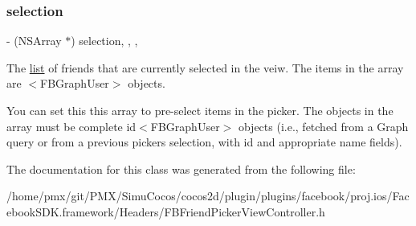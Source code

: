\subsubsection{\texorpdfstring{selection}{selection}}
{\footnotesize\ttfamily -\/ (N\+S\+Array $\ast$) selection\hspace{0.3cm}{\ttfamily [read]}, {\ttfamily [write]}, {\ttfamily [nonatomic]}, {\ttfamily [copy]}}

The \hyperlink{protocollist-p}{list} of friends that are currently selected in the veiw. The items in the array are $<$\+F\+B\+Graph\+User$>$ objects.

You can set this this array to pre-\/select items in the picker. The objects in the array must be complete id$<$\+F\+B\+Graph\+User$>$ objects (i.\+e., fetched from a Graph query or from a previous picker\textquotesingle{}s selection, with id and appropriate name fields). 

The documentation for this class was generated from the following file\+:\begin{DoxyCompactItemize}
\item 
/home/pmx/git/\+P\+M\+X/\+Simu\+Cocos/cocos2d/plugin/plugins/facebook/proj.\+ios/\+Facebook\+S\+D\+K.\+framework/\+Headers/F\+B\+Friend\+Picker\+View\+Controller.\+h\end{DoxyCompactItemize}
